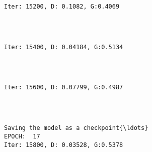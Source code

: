 \documentclass[11pt]{article}
\begin{document}
    \begin{Verbatim}[commandchars=\\\{\}]

Iter: 15200, D: 0.1082, G:0.4069
    \end{Verbatim}

    \begin{center}
    \end{center}
    { \hspace*{\fill} \\}
    
    \begin{Verbatim}[commandchars=\\\{\}]

Iter: 15400, D: 0.04184, G:0.5134
    \end{Verbatim}

    \begin{center}
    \end{center}
    { \hspace*{\fill} \\}
    
    \begin{Verbatim}[commandchars=\\\{\}]

Iter: 15600, D: 0.07799, G:0.4987
    \end{Verbatim}

    \begin{center}
    \end{center}
    { \hspace*{\fill} \\}
    
    \begin{Verbatim}[commandchars=\\\{\}]

Saving the model as a checkpoint{\ldots}
EPOCH:  17
Iter: 15800, D: 0.03528, G:0.5378
    \end{Verbatim}

    \begin{center}
    \end{center}
    { \hspace*{\fill} \\}
    
\end{document}
